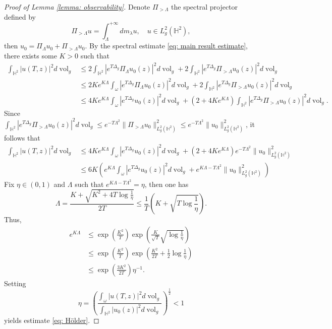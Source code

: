 \documentclass[letterpaper,11pt]{amsart}
\theoremstyle{note}
\numberwithin{equation}{section}
\DeclareMathOperator{\vol}{vol}
\begin{document}
\begin{proof}[Proof of Lemma \ref{lemma: observability}]
    Denote $\Pi_{>\Lambda}$ the spectral projector defined by $$\Pi_{>\Lambda} u = \int_\Lambda^{+\infty} dm_\lambda u, \quad u \in L^2_g(\mathbb{H}^2),$$ then $u_0 = \Pi_\Lambda u_0 + \Pi_{>\Lambda} u_0$. By the spectral estimate \eqref{eq: main result estimate}, there exists some $K > 0$ such that $$\begin{aligned}
        \int_{\mathbb{H}^2} |u(T,z)|^2 d\vol_g &\leq 2 \int_{\mathbb{H}^2} |e^{T\Delta_g} \Pi_\Lambda u_0(z)|^2 d\vol_g + 2 \int_{\mathbb{H}^2} |e^{T\Delta_g} \Pi_{>\Lambda} u_0(z)|^2 d\vol_g \\
        &\leq 2Ke^{K\Lambda} \int_\omega |e^{T\Delta_g} \Pi_\Lambda u_0(z)|^2 d\vol_g + 2 \int_{\mathbb{H}^2} |e^{T\Delta_g} \Pi_{>\Lambda} u_0(z)|^2 d\vol_g \\
        &\leq 4Ke^{K\Lambda} \int_\omega |e^{T\Delta_g} u_0(z)|^2 d\vol_g + (2+4Ke^{K\Lambda}) \int_{\mathbb{H}^2} |e^{T\Delta_g} \Pi_{>\Lambda} u_0(z)|^2 d\vol_g.
    \end{aligned}$$ Since $\int_{\mathbb{H}^2}|e^{T\Delta_g} \Pi_{>\Lambda} u_0(z)|^2 d\vol_g \leq e^{-T\Lambda^2} \|\Pi_{>\Lambda} u_0\|_{L^2_g(\mathbb{H}^2)}^2 \leq e^{-T\Lambda^2} \|u_0\|_{L^2_g(\mathbb{H}^2)}^2$, it follows that \begin{equation}
        \begin{aligned}\int_{\mathbb{H}^2} |u(T,z)|^2 d\vol_g &\leq 4Ke^{K\Lambda} \int_\omega |e^{T\Delta_g} u_0(z)|^2 d\vol_g + (2+4Ke^{K\Lambda}) e^{-T\Lambda^2} \|u_0\|_{L^2_g(\mathbb{H}^2)}^2 \\
        &\leq 6K \left(e^{K\Lambda} \int_\omega |e^{T\Delta_g} u_0(z)|^2 d\vol_g + e^{K\Lambda - T\Lambda^2} \|u_0\|_{L^2_g(\mathbb{H}^2)}^2\right)\end{aligned}
    \end{equation} Fix $\eta \in (0,1)$ and $\Lambda$ such that $e^{K\Lambda - T\Lambda^2} = \eta$, then one has $$\Lambda = \frac{K + \sqrt{K^2 + 4T\log\frac{1}{\eta}}}{2T} \leq \frac{1}{T} \left(K + \sqrt{T \log\frac{1}{\eta}}\right).$$ Thus, $$\begin{aligned}
        e^{K\Lambda} &\leq \exp\left(\frac{K^2}{T}\right) \exp\left(\frac{K}{\sqrt{T}}\sqrt{\log\frac{1}{\eta}}\right) \\
        &\leq \exp\left(\frac{K^2}{T}\right) \exp\left(\frac{K^2}{2T} +\frac{1}{2}\log\frac{1}{\eta}\right) \\
        &\leq \exp\left(\frac{3K^2}{2T}\right) \eta^{-1}.
    \end{aligned}$$
    Setting $$\eta = \left(\frac{\int_\omega |u(T,z)|^2 d\vol_g}{\int_{\mathbb{H}^2} |u_0(z)|^2 d\vol_g}\right)^\frac{1}{2} < 1$$ yields estimate \eqref{eq: Hölder}.


\end{proof}
\end{document}
